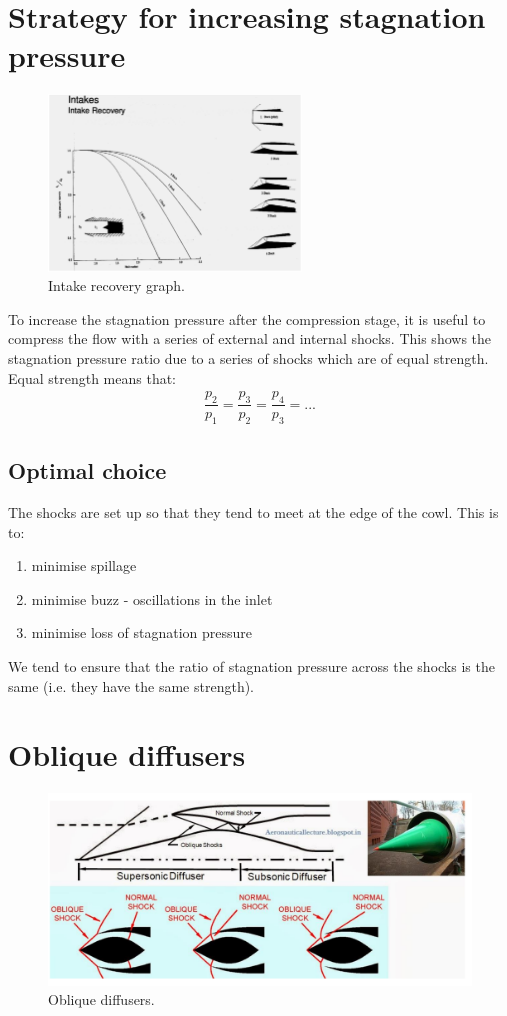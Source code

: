 \section{Strategy for increasing stagnation pressure}
\begin{figure}[H]
    \centering
    \includegraphics[width = 0.6\textwidth]{./img/diagram50.png}
    \caption{Intake recovery graph.}
\end{figure}
To increase the stagnation pressure after the compression stage, it is useful to compress the flow with a series of external and internal shocks. This shows the stagnation pressure ratio due to a series of shocks which are of equal strength. Equal strength means that:
\begin{gather}
    \dfrac{p_2}{p_1} = \dfrac{p_3}{p_2} = \dfrac{p_4}{p_3} = ...
\end{gather}
\subsection{Optimal choice}
The shocks are set up so that they tend to meet at the edge of the cowl. This is to:
\begin{enumerate}
    \item minimise spillage
    \item minimise buzz - oscillations in the inlet
    \item minimise loss of stagnation pressure
\end{enumerate}
We tend to ensure that the ratio of stagnation pressure across the shocks is the same (i.e. they have the same strength).
\section{Oblique diffusers}
\begin{figure}[H]
    \centering
    \includegraphics[width = \textwidth]{./img/diagram51.png}
    \caption{Oblique diffusers.}
\end{figure}
